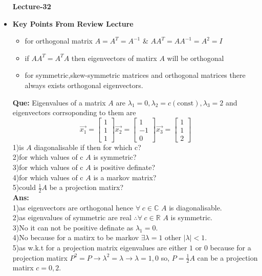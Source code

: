 \documentclass[a4paper,11pt]{article}
\numberwithin{equation}{section}
\begin{document}
\begin{itemize}
\begin{center}
    \Huge{\textbf{Lecture-32}}
\end{center}
\vspace{5pt}
\item \textbf{Key Points From Review Lecture}
\begin{itemize}
    \item for orthogonal matrix $A=A^T=A^{-1}$ \& $AA^T=AA^{-1}=A^2=I$
    \item if $AA^T=A^TA$ then eigenvectors of matirx $A$ will be orthogonal
    \item for symmetric,skew-symmetric matrices and orthogonal matrices there always exists orthogonal eigenvectors.\\
\end{itemize}
\textbf{Que: }Eigenvalues of a matrix $A$ are $\lambda_1=0,\lambda_2=c(\text{const}),\lambda_3=2$ and eigenvectors corrsoponding to them are
\[\vec{x_1}=\begin{bmatrix}1\\1\\1 \end{bmatrix}
\vec{x_2}=\begin{bmatrix}1\\-1\\0 \end{bmatrix}
\vec{x_3}=\begin{bmatrix}1\\1\\2 \end{bmatrix}
\]
1)is $A$ diagonalisable if then for which c?\\
2)for which values of c $A$ is symmetric?\\
3)for which values of c $A$ is positive definate?\\
4)for which values of c $A$ is a markov matrix?\\
 5)could $\frac{1}{2}A$ be a projection matirx?\\
\textbf{Ans: }\\
1)as eigenvectors are orthogonal hence $\forall \hspace{3pt} c\in \mathbb{C}$ $A$ is diagonalisable.\\
2)as eigenvalues of symmetric are real $\therefore \forall \hspace{3pt} c\in \mathbb{R}$ $A$ is symmetric.\\
3)No it can not be positive definate as $\lambda_1=0$.\\
4)No because for a matirx to be markov $\exists \lambda=1$ other $\vert \lambda \vert<1$.\\
5)as w.k.t for a projection matrix eigenvalues are either $1$ or $0$ because for a projection matirx $P^2=P\rightarrow \lambda^2=\lambda \rightarrow \lambda=1,0$ so, $P=\frac{1}{2}A$ can be a projection matirx $c=0,2$.\\


\end{itemize}
\end{document}
